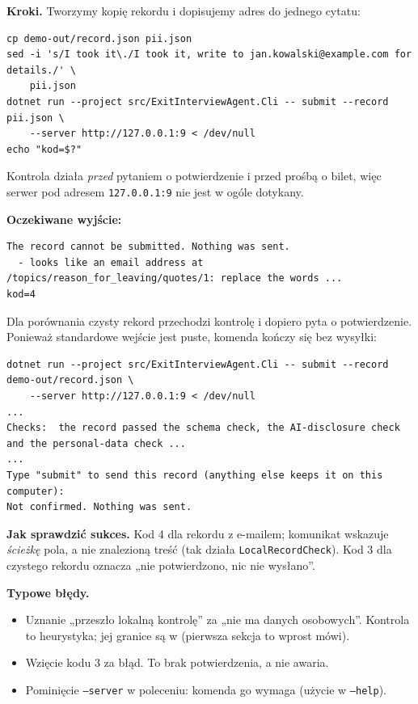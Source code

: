{\textbf{Kroki.} Tworzymy kopię rekordu i dopisujemy adres do jednego cytatu:

\begin{Verbatim}[fontsize=\scriptsize,frame=single,framesep=2mm]
cp demo-out/record.json pii.json
sed -i 's/I took it\./I took it, write to jan.kowalski@example.com for details./' \
    pii.json
dotnet run --project src/ExitInterviewAgent.Cli -- submit --record pii.json \
    --server http://127.0.0.1:9 < /dev/null
echo "kod=$?"
\end{Verbatim}

Kontrola działa \emph{przed} pytaniem o potwierdzenie i przed prośbą o bilet, więc
serwer pod adresem \texttt{127.0.0.1:9} nie jest w ogóle dotykany.

\textbf{Oczekiwane wyjście:}

\begin{Verbatim}[fontsize=\scriptsize,frame=single,framesep=2mm]
The record cannot be submitted. Nothing was sent.
  - looks like an email address at /topics/reason_for_leaving/quotes/1: replace the words ...
kod=4
\end{Verbatim}

Dla porównania czysty rekord przechodzi kontrolę i dopiero pyta o potwierdzenie.
Ponieważ standardowe wejście jest puste, komenda kończy się bez wysyłki:

\begin{Verbatim}[fontsize=\scriptsize,frame=single,framesep=2mm]
dotnet run --project src/ExitInterviewAgent.Cli -- submit --record demo-out/record.json \
    --server http://127.0.0.1:9 < /dev/null
...
Checks:  the record passed the schema check, the AI-disclosure check and the personal-data check ...
...
Type "submit" to send this record (anything else keeps it on this computer):
Not confirmed. Nothing was sent.
\end{Verbatim}

\textbf{Jak sprawdzić sukces.} Kod 4 dla rekordu z e-mailem; komunikat wskazuje
\emph{ścieżkę} pola, a nie znalezioną treść (tak działa \texttt{LocalRecordCheck}).
Kod 3 dla czystego rekordu oznacza „nie potwierdzono, nic nie wysłano”.

\textbf{Typowe błędy.}
\begin{itemize}[leftmargin=*,itemsep=1pt]
  \item Uznanie „przeszło lokalną kontrolę” za „nie ma danych osobowych”. Kontrola
        to heurystyka; jej granice są w 
        (pierwsza sekcja to wprost mówi).
  \item Wzięcie kodu 3 za błąd. To brak potwierdzenia, a nie awaria.
  \item Pominięcie \texttt{--server} w poleceniu: komenda go wymaga (użycie w \texttt{--help}).
\end{itemize}

}
